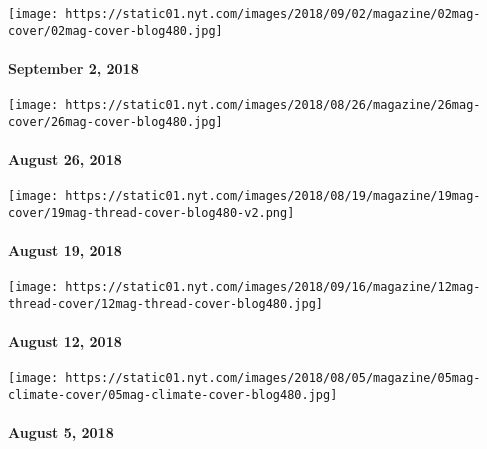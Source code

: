 \href{https://www.nytimes.com/issue/magazine/2018/09/04/the-9218-issue}{}

\texttt{[image: https://static01.nyt.com/images/2018/09/02/magazine/02mag-cover/02mag-cover-blog480.jpg]}

\hypertarget{september-2-2018}{%
\paragraph{September 2, 2018}\label{september-2-2018}}

\href{https://www.nytimes.com/issue/magazine/2018/08/24/the-82618-issue}{}

\texttt{[image: https://static01.nyt.com/images/2018/08/26/magazine/26mag-cover/26mag-cover-blog480.jpg]}

\hypertarget{august-26-2018}{%
\paragraph{August 26, 2018}\label{august-26-2018}}

\href{https://www.nytimes.com/issue/magazine/2018/08/24/the-81918-issue}{}

\texttt{[image: https://static01.nyt.com/images/2018/08/19/magazine/19mag-cover/19mag-thread-cover-blog480-v2.png]}

\hypertarget{august-19-2018}{%
\paragraph{August 19, 2018}\label{august-19-2018}}

\href{https://www.nytimes.com/issue/magazine/2018/08/24/the-81218-issue}{}

\texttt{[image: https://static01.nyt.com/images/2018/09/16/magazine/12mag-thread-cover/12mag-thread-cover-blog480.jpg]}

\hypertarget{august-12-2018}{%
\paragraph{August 12, 2018}\label{august-12-2018}}

\href{https://www.nytimes.com/interactive/2018/08/01/magazine/climate-change-losing-earth.html}{}

\texttt{[image: https://static01.nyt.com/images/2018/08/05/magazine/05mag-climate-cover/05mag-climate-cover-blog480.jpg]}

\hypertarget{august-5-2018}{%
\paragraph{August 5, 2018}\label{august-5-2018}}

